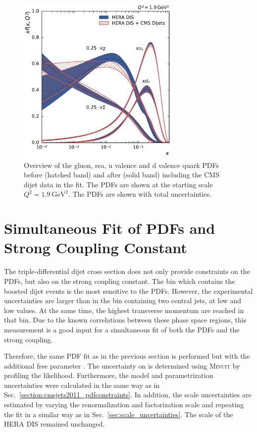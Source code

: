 \begin{figure}[tbp]
  \centering
  \includegraphics[width=0.7\textwidth]{figures/pdf_constraints/pdfcomp_direct_overview_1.9.pdf}\hfill%
  \caption[Overview of gluon and quark PDFs]{Overview of the gluon, sea, u
  valence and d valence quark PDFs before (hatched band) and after (solid band)
  including the CMS dijet data in the fit. The PDFs are shown at the starting
  scale $Q^2 = \SI{1.9}{\GeV \squared}$. The PDFs are shown with total
  uncertainties.}
  \label{fig:pdfconstraints:overview:19}
\end{figure}

\section{Simultaneous Fit of PDFs and Strong Coupling Constant}

The triple-differential dijet cross section does not only provide constraints on
the PDFs, but also on the strong coupling constant. The bin which contains the
boosted dijet events is the most sensitive to the PDFs. However, the
experimental uncertainties are larger than in the bin containing two central
jets, \ie at low \yboost and low \ystar values. At the same time, the highest
transverse momentum are reached in that bin. Due to the known correlations
between these phase space regions, this measurement is a good input for a
simultaneous fit of both the PDFs and the strong coupling. 

Therefore, the same PDF fit as in the previous section is performed but with the
additional free parameter \as. The uncertainty on \as is determined using
\textsc{Minuit} by profiling the likelihood. Furthermore, the model and
parametrization uncertainties were calculated in the same way as in
Sec.~\ref{section:cmsjets2011_pdfconstraints}. In addition, the scale
uncertainties are estimated by varying the renormalization and factorization
scale and repeating the fit in a similar way as in
Sec.~\ref{sec:scale_uncertainties}. The scale of the HERA DIS remained
unchanged. 

